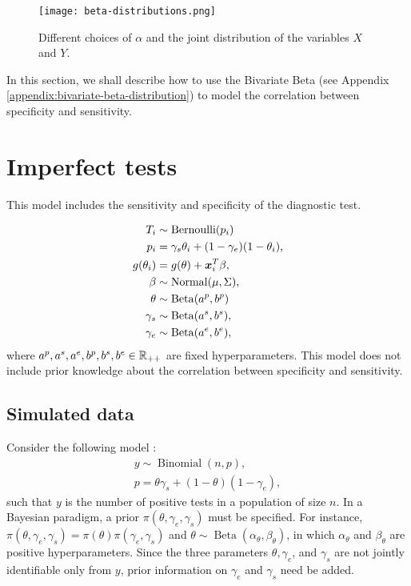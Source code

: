 \begin{figure}[!ht]
    \centering
    \texttt{[image: beta-distributions.png]}
    \caption{Different choices of $\alpha$ and the joint distribution of the variables $X$ and $Y$.}
    \label{fig:beta-bivariate}
\end{figure}

In this section, we shall describe how to use the Bivariate Beta (see Appendix
\ref{appendix:bivariate-beta-distribution}) to model the correlation between
specificity and sensitivity.

\section{Imperfect tests}

This model includes the sensitivity and specificity of the diagnostic test. 

\begin{equation}
  \begin{aligned}
    T_i &\sim \operatorname{Bernoulli}(p_i) \\
    p_i &= \gamma_s\theta_i + (1-\gamma_e)(1 - \theta_i),  \\
    g(\theta_i) &= g(\theta) + \boldsymbol{x}_i^T\beta,  \\
    \beta &\sim \operatorname{Normal}(\mu, \Sigma), \\ 
    \theta &\sim \operatorname{Beta}(a^p, b^p) \\
    \gamma_s &\sim \operatorname{Beta}(a^s, b^s), \\
    \gamma_e &\sim \operatorname{Beta}(a^e, b^e), \\    
  \end{aligned}  
\end{equation}
where $a^p, a^s, a^e, b^p, b^s, b^e \in \mathbb{R}_{++}$ are fixed hyperparameters.
This model does not include prior knowledge about the correlation between
specificity and sensitivity. 

\subsection{Simulated data}

Consider the following model \cite{gelman2020bayesian}:
\begin{gather*}
  y \sim \operatorname{Binomial}(n, p), \\
  p = \theta\gamma_s + (1- \theta)(1-\gamma_e), 
\end{gather*}
such that $y$ is the number of positive tests in a population of size $n$. In
a Bayesian paradigm, a prior $\pi(\theta, \gamma_e, \gamma_s)$ must be
specified. For instance, $\pi(\theta, \gamma_e, \gamma_s) =
\pi(\theta)\pi(\gamma_e, \gamma_s)$ and $\theta \sim
\operatorname{Beta}(\alpha_{\theta}, \beta_{\theta})$, in which
$\alpha_{\theta}$ and $\beta_{\theta}$ are positive hyperparameters. Since the
three parameters $\theta, \gamma_e$, and $\gamma_s$ are not jointly
identifiable only from $y$, prior information on $\gamma_e$ and $\gamma_s$
need be added. 

